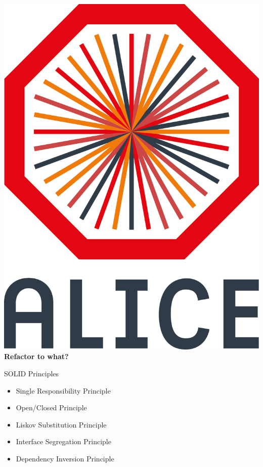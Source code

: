 \documentclass[aspectratio=1610,14pt,dvipsnames]{beamer}
\begin{document}
\begin{frame}{\includegraphics[height=0.07\textheight]{2012-Jul-04-4_Color_Logo_CB.png} \hspace{0.2cm}\textbf{Refactor to what?}}
  \begin{block}{SOLID Principles}
    \begin{itemize}
      \item Single Responsibility Principle
      \item Open/Closed Principle
      \item Liskov Substitution Principle
      \item Interface Segregation Principle
      \item Dependency Inversion Principle
    \end{itemize}
  \end{block}
\end{frame}
\end{document}
